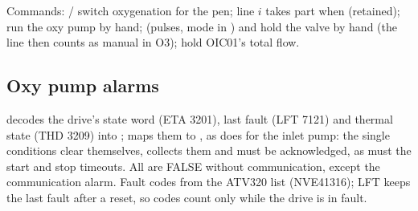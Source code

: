\documentclass[11pt]{article}
\begin{document}
Commands:  /  switch oxygenation for the pen; line $i$
takes part when  (retained);
 run the oxy pump by hand;
 (pulses, mode in ) and
 hold the valve by hand (the line then
counts as manual in O3);  hold OIC01's total flow.

\subsection*{Oxy pump alarms}

 decodes the drive's state word (ETA 3201), last fault (LFT 7121) and thermal
state (THD 3209) into ;  maps them to
, as  does for the inlet pump: the
single conditions clear themselves,  collects them and must be acknowledged, as
must the start and stop timeouts. All are FALSE without communication, except the communication
alarm. Fault codes from the ATV320 list (NVE41316); LFT keeps the last fault after a reset, so codes
count only while the drive is in fault.
\end{document}
